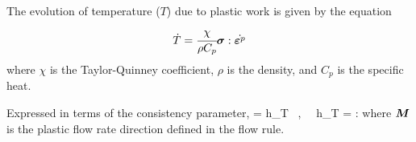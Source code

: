 The evolution of temperature ($T$) due to plastic work is given by the equation
\begin{equation}
  \dot{T} = \cfrac{\chi}{\rho C_p} \boldsymbol{\sigma}:\dot{\boldsymbol{\varepsilon}^p} 
\end{equation}
where $\chi$ is the Taylor-Quinney coefficient, $\rho$ is the density, and
$C_p$ is the specific heat.

Expressed in terms of the consistency parameter,
\Beq
   = \dot{\lambda} h_T ~,~~ h_T =  \Bsig:\BM 
\Eeq
where $\boldsymbol{M}$ is the plastic flow rate direction defined in the flow rule.

